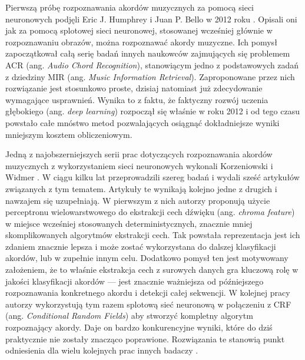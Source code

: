 Pierwszą próbę rozpoznawania akordów muzycznych za pomocą sieci neuronowych podjęli Eric J. Humphrey i Juan P. Bello w 2012 roku \cite{humphrey_rethinking_2012}. Opisali oni jak za pomocą splotowej sieci neuronowej, stosowanej wcześniej głównie w rozpoznawaniu obrazów, można rozpoznawać akordy muzyczne. Ich pomysł zapoczątkował całą serię badań innych naukowców zajmujących się problemem ACR (ang. \emph{Audio Chord Recognition}), stanowiącym jedno z podstawowych zadań z dziedziny MIR (ang. \emph{Music Information Retrieval}). Zaproponowane przez nich rozwiązanie jest stosunkowo proste, dzisiaj natomiast już zdecydowanie wymagające usprawnień. Wynika to z faktu, że faktyczny rozwój uczenia głębokiego (ang. \emph{deep learning}) rozpoczął się właśnie w roku 2012 i od tego czasu powstało całe mnóstwo metod pozwalających osiągnąć dokładniejsze wyniki mniejszym kosztem obliczeniowym.

Jedną z najobszerniejszych serii prac dotyczących rozpoznawania akordów muzycznych z wykorzystaniem sieci neuronowych wykonali Korzeniowski i Widmer \cite{korzeniowski_feature_2016,korzeniowski_fully_2016,korzeniowski_futility_2017,korzeniowski_improved_2018,korzeniowski_automatic_2018,korzeniowski_large-scale_2018}. W ciągu kilku lat przeprowadzili szereg badań i wydali sześć artykułów związanych z tym tematem. Artykuły te wynikają kolejno jedne z drugich i nawzajem się uzupełniają. W pierwszym z nich \cite{korzeniowski_feature_2016} autorzy proponują użycie perceptronu wielowarstwowego do ekstrakcji cech dźwięku (ang. \emph{chroma feature}) w miejsce wcześniej stosowanych deterministycznych, znacznie mniej skomplikowanych algorytmów ekstrakcji cech. Tak powstała reprezentacja jest ich zdaniem znacznie lepsza i może zostać wykorzystana do dalszej klasyfikacji akordów, lub w zupełnie innym celu. Dodatkowo pomysł ten jest motywowany założeniem, że to właśnie ekstrakcja cech z surowych danych gra kluczową rolę w jakości klasyfikacji akordów --- jest znacznie ważniejsza od późniejszego rozpoznawania konkretnego akordu i detekcji całej sekwencji. W kolejnej pracy \cite{korzeniowski_fully_2016} autorzy wykorzystują tym razem splotową sieć neuronową w połączeniu z CRF (ang. \emph{Conditional Random Fields}) aby stworzyć kompletny algorytm rozpoznający akordy. Daje on bardzo konkurencyjne wyniki, które do dziś praktycznie nie zostały znacząco poprawione. Rozwiązania te stanowią punkt odniesienia dla wielu kolejnych prac innych badaczy \cite{ohanlon_fifthnet_2021, park_bi-directional_2019}.

